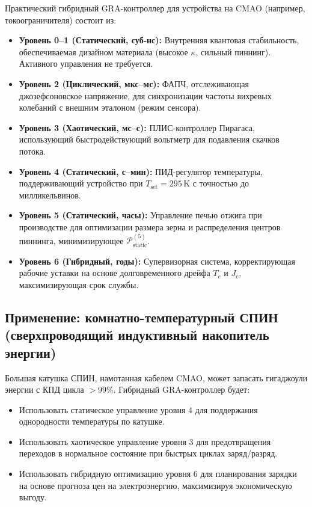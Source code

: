 \documentclass[12pt,a4paper]{article}
\numberwithin{equation}{section}
\begin{document}
Практический гибридный GRA-контроллер для устройства на CMAO (например, токоограничителя) состоит из:
\begin{itemize}
    \item \textbf{Уровень 0–1 (Статический, суб-нс):} Внутренняя квантовая стабильность, обеспечиваемая дизайном материала (высокое $\kappa$, сильный пиннинг). Активного управления не требуется.
    \item \textbf{Уровень 2 (Циклический, мкс--мс):} ФАПЧ, отслеживающая джозефсоновское напряжение, для синхронизации частоты вихревых колебаний с внешним эталоном (режим сенсора).
    \item \textbf{Уровень 3 (Хаотический, мс--с):} ПЛИС-контроллер Пирагаса, использующий быстродействующий вольтметр для подавления скачков потока.
    \item \textbf{Уровень 4 (Статический, с--мин):} ПИД-регулятор температуры, поддерживающий устройство при $T_{\text{set}} = 295$\,K с точностью до милликельвинов.
    \item \textbf{Уровень 5 (Статический, часы):} Управление печью отжига при производстве для оптимизации размера зерна и распределения центров пиннинга, минимизирующее $\mathcal{P}_{\text{static}}^{(5)}$.
    \item \textbf{Уровень 6 (Гибридный, годы):} Супервизорная система, корректирующая рабочие уставки на основе долговременного дрейфа $T_c$ и $J_c$, максимизирующая срок службы.
\end{itemize}

\subsection{Применение: комнатно-температурный СПИН (сверхпроводящий индуктивный накопитель энергии)}

Большая катушка СПИН, намотанная кабелем CMAO, может запасать гигаджоули энергии с КПД цикла $>99\%$. Гибридный GRA-контроллер будет:
\begin{itemize}
    \item Использовать статическое управление уровня 4 для поддержания однородности температуры по катушке.
    \item Использовать хаотическое управление уровня 3 для предотвращения переходов в нормальное состояние при быстрых циклах заряд/разряд.
    \item Использовать гибридную оптимизацию уровня 6 для планирования зарядки на основе прогноза цен на электроэнергию, максимизируя экономическую выгоду.
\end{itemize}
\end{document}
